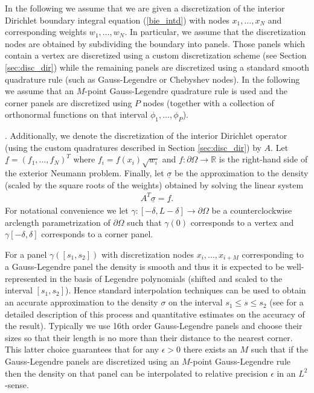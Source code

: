 In the following we assume that we are given a discretization of the interior Dirichlet boundary integral equation (\ref{bie_intd}) with nodes $x_1,\dots,x_N$ and corresponding weights $w_1,\dots,w_N.$ In particular, we assume that the discretization nodes are obtained by subdividing the boundary into panels. Those panels which contain a vertex are discretized using a custom discretization scheme (see Section \ref{sec:disc_dir}) while the remaining panels are discretized using a standard smooth quadrature rule (such as Gauss-Legendre or Chebyshev nodes). In the following we assume that an $M$-point Gauss-Legendre quadrature rule is used and the corner panels are discretized using $P$ nodes (together with a collection of orthonormal functions on that interval $\phi_1,\dots,\phi_P$).

. Additionally, we denote the discretization of the interior Dirichlet operator (using the custom quadratures described in Section \ref{sec:disc_dir}) by $A.$ Let $\underline{f} = (f_1,\dots,f_N)^T$ where $f_i = f(x_i) \sqrt{w_i}$ and $f: \partial \Omega \to \mathbb{R}$ is the right-hand side of the exterior Neumann problem. Finally, let $\underline{\sigma}$ be the approximation to the density (scaled by the square roots of the weights) obtained by solving the linear system
\begin{align}\label{eqn:adj_linalg}
A^T \underline{\sigma} = \underline{f}.
\end{align}
For notational convenience we let $\gamma:[-\delta,L-\delta] \to \partial \Omega$ be a counterclockwise arclength parametrization of $\partial \Omega$ such that  $\gamma(0)$ corresponds to a vertex and $\gamma[-\delta,\delta]$ corresponds to a corner panel.

For a panel $\gamma([s_1,s_2])$ with discretization nodes $x_i,\dots,x_{i+M}$ corresponding to a Gauss-Legendre panel the density is smooth and thus it is expected to be well-represented in the basis of Legendre polynomials (shifted and scaled to the interval $[s_1,s_2]$). Hence standard interpolation techniques can be used to obtain an accurate approximation to the density $\sigma$ on the interval $s_1 \le s\le s_2$ (see \cite{} for a detailed description of this process and quantitative estimates on the accuracy of the result). Typically we use 16th order Gauss-Legendre panels and choose their sizes so that their length is no more than their distance to the nearest corner. {\color{red}This latter choice guarantees that for any $\epsilon>0$ there exists an $M$ such that if the Gauss-Legendre panels are discretized using an $M$-point Gauss-Legendre rule then the density on that panel can be interpolated to relative precision $\epsilon$ in an $L^2$-sense.}

